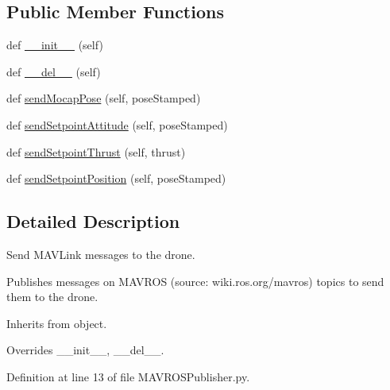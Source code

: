 \subsection*{Public Member Functions}
\begin{DoxyCompactItemize}
\item 
def \mbox{\hyperlink{classwindshape_1_1drone_1_1fcu_1_1_m_a_v_r_o_s_publisher_1_1_m_a_v_r_o_s_publisher_a10cfd0a0d42197a370f775a04049477e}{\+\_\+\+\_\+init\+\_\+\+\_\+}} (self)
\item 
def \mbox{\hyperlink{classwindshape_1_1drone_1_1fcu_1_1_m_a_v_r_o_s_publisher_1_1_m_a_v_r_o_s_publisher_aa84bfd1b791fea34064147f1690ea75e}{\+\_\+\+\_\+del\+\_\+\+\_\+}} (self)
\item 
def \mbox{\hyperlink{classwindshape_1_1drone_1_1fcu_1_1_m_a_v_r_o_s_publisher_1_1_m_a_v_r_o_s_publisher_a7d835864fcf0ea245f8ac865fe20f8e0}{send\+Mocap\+Pose}} (self, pose\+Stamped)
\item 
def \mbox{\hyperlink{classwindshape_1_1drone_1_1fcu_1_1_m_a_v_r_o_s_publisher_1_1_m_a_v_r_o_s_publisher_a4290fac2959b383fb3f9fa6e0c51e821}{send\+Setpoint\+Attitude}} (self, pose\+Stamped)
\item 
def \mbox{\hyperlink{classwindshape_1_1drone_1_1fcu_1_1_m_a_v_r_o_s_publisher_1_1_m_a_v_r_o_s_publisher_acd8b2f7beafc7c3d9cfc313cedf49621}{send\+Setpoint\+Thrust}} (self, thrust)
\item 
def \mbox{\hyperlink{classwindshape_1_1drone_1_1fcu_1_1_m_a_v_r_o_s_publisher_1_1_m_a_v_r_o_s_publisher_abfcd6335679c34adce910a77374cfda5}{send\+Setpoint\+Position}} (self, pose\+Stamped)
\end{DoxyCompactItemize}


\subsection{Detailed Description}
\begin{DoxyVerb}Send MAVLink messages to the drone.

Publishes messages on MAVROS (source: wiki.ros.org/mavros) topics
to send them to the drone.

Inherits from object.

Overrides __init__, __del__.
\end{DoxyVerb}
 

Definition at line 13 of file M\+A\+V\+R\+O\+S\+Publisher.\+py.



